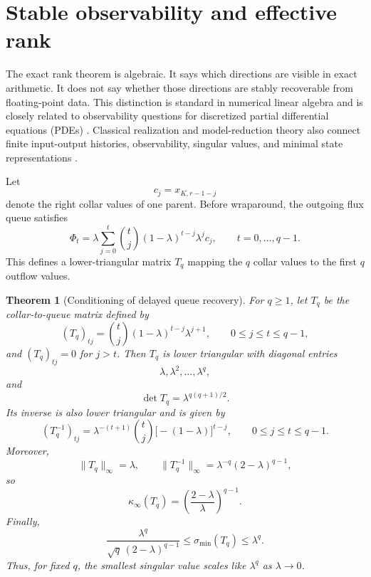 \documentclass[preprint,12pt]{elsarticle}
\theoremstyle{plain}
\newtheorem{theorem}{Theorem}
\theoremstyle{remark}
\theoremstyle{definition}
\begin{document}
\section{Stable observability and effective rank}
\label{sec:stable-observability}

The exact rank theorem is algebraic.  It says which directions are visible
in exact arithmetic.  It does not say whether those directions are stably
recoverable from floating-point data.  This distinction is standard in
numerical linear algebra \cite{TrefethenBau:1997nla,Higham:2002accuracy} and is closely related to observability questions for discretized partial differential equations (PDEs) \cite{CohnDee:1988observability}.  Classical realization and model-reduction theory also connect finite input-output
histories, observability, singular values, and minimal state representations
\cite{HoKalman:1966realization,Moore:1981pca}.

Let
\[
  c_j=x_{K,r-1-j}
\]
denote the right collar values of one parent.  Before wraparound, the
outgoing flux queue satisfies
\[
  \Phi_t
  =
  \lambda
  \sum_{j=0}^{t}
  \binom{t}{j}
  (1-\lambda)^{t-j}\lambda^j c_j,
  \qquad
  t=0,\ldots,q-1.
\]
This defines a lower-triangular matrix \(T_q\) mapping the \(q\) collar
values to the first \(q\) outflow values.

\begin{theorem}[Conditioning of delayed queue recovery]
\label{thm:conditioning}
For \(q\ge1\), let \(T_q\) be the collar-to-queue matrix defined by
\[
  (T_q)_{tj}
  =
  \binom{t}{j}(1-\lambda)^{t-j}\lambda^{j+1},
  \qquad
  0\le j\le t\le q-1,
\]
and \((T_q)_{tj}=0\) for \(j>t\).  Then \(T_q\) is lower triangular with
diagonal entries
\[
  \lambda,\lambda^2,\ldots,\lambda^q,
\]
and
\[
  \det T_q=\lambda^{q(q+1)/2}.
\]
Its inverse is also lower triangular and is given by
\[
  (T_q^{-1})_{tj}
  =
  \lambda^{-(t+1)}
  \binom{t}{j}
  \bigl[-(1-\lambda)\bigr]^{t-j},
  \qquad
  0\le j\le t\le q-1.
\]
Moreover,
\[
  \|T_q\|_\infty=\lambda,
  \qquad
  \|T_q^{-1}\|_\infty
  =
  \lambda^{-q}(2-\lambda)^{q-1},
\]
so
\[
  \kappa_\infty(T_q)
  =
  \left(\frac{2-\lambda}{\lambda}\right)^{q-1}.
\]
Finally,
\[
  \frac{\lambda^q}{\sqrt q\,(2-\lambda)^{q-1}}
  \le
  \sigma_{\min}(T_q)
  \le
  \lambda^q.
\]
Thus, for fixed \(q\), the smallest singular value scales like
\(\lambda^q\) as \(\lambda\to0\).
\end{theorem}
\end{document}
